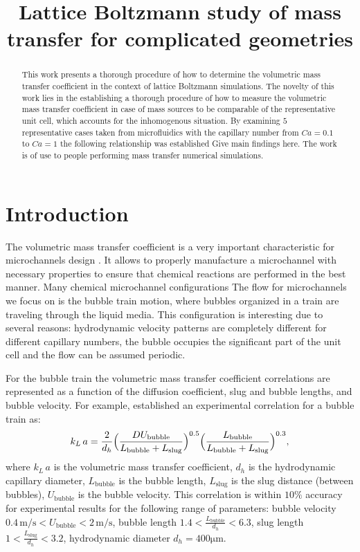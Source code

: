 \documentclass{article}
\title{Lattice Boltzmann study of mass transfer for complicated geometries}
\newcommand{\vol}{k_L\,a}
\newcommand{\lbubble}{L_{\mathrm{bubble}}}
\newcommand{\lslug}{L_{\mathrm{slug}}}
\newcommand{\ububble}{U_{\mathrm{bubble}}}
\begin{document}
\maketitle
\begin{abstract}
This work presents a thorough procedure of how to determine the volumetric mass transfer
coefficient
in the context of lattice Boltzmann simulations. The novelty of this work lies in the establishing
a thorough procedure of how to measure the volumetric mass transfer coefficient in case of mass
sources to be comparable of the representative unit cell, which accounts for the inhomogenous
situation. By examining $5$ representative cases taken from microfluidics with the capillary number
from $Ca=0.1$ to $Ca=1$ the following relationship was established {\color{red} Give main findings
here}. The work is of use to people performing mass transfer numerical simulations.
\end{abstract}

\section{Introduction}
The volumetric mass transfer coefficient is a very important characteristic for microchannels 
design \cite{kreutzer-overview}. It allows to
properly manufacture a microchannel with necessary properties to ensure that chemical
reactions are performed in the best manner. Many chemical microchannel configurations
\cite{kreutzer-pressure-drop}  The flow for microchannels we focus on is the bubble train
motion, where bubbles organized in a train are traveling through the liquid media. This
configuration is interesting due to several reasons: hydrodynamic velocity patterns are completely
different for different capillary numbers, the bubble occupies the significant part of the unit cell
and the flow can be assumed periodic. 

For the bubble train the volumetric mass transfer coefficient correlations are represented as a
function of the diffusion coefficient, slug and bubble lengths, and bubble velocity. For example,
\citet{yue-mass} established an experimental correlation for a bubble train as: 
\begin{equation}
\vol =\frac{2}{d_h} \Bigl(\frac{D
\ububble}{\lbubble+\lslug}\Bigr)^{0.5}
\Bigl(\frac{\lbubble}{\lbubble+\lslug}\Bigr)^{0.3},
\end{equation}
where $\vol$ is the volumetric mass transfer coefficient, $d_h$ is the hydrodynamic capillary
diameter, $\lbubble$ is the bubble length, $\lslug$ is the slug distance (between bubbles),
$\ububble$ is the bubble velocity. This correlation is within $10\%$ accuracy for experimental
results for the following range of
parameters: bubble velocity $0.4\,\mathrm{m/s}<\ububble<2\,\mathrm{m/s}$, bubble length
$1.4<\frac{\lbubble}{d_h}<6.3$, slug length $1<\frac{\lslug}{d_h}<3.2$,
hydrodynamic diameter $d_h = 400 \mathrm{\mu m}$.
\end{document}
